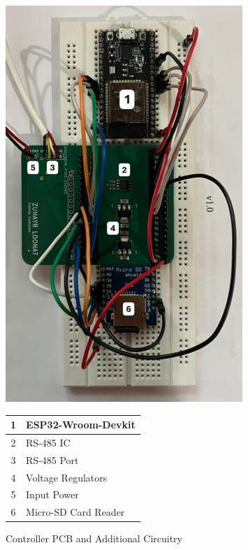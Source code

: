 \begin{figure}[H]
    \begin{minipage}{0.5\textwidth}
        \centering
        \includegraphics[width=0.8\textwidth]{Figures/controller_circuit.jpg}
    \end{minipage}
    \begin{minipage}{0.5\textwidth}
        \centering
        \begin{tabular}{cl} \hline
            1 & ESP32-Wroom-Devkit \\ \hline
            2 & RS-485 IC \\ \hline
            3 & RS-485 Port \\ \hline
            4 & Voltage Regulators \\ \hline
            5 & Input Power \\ \hline
            6 & Micro-SD Card Reader \\ \hline
        \end{tabular}
    \end{minipage}
    \caption{Controller PCB and Additional Circuitry}
    \label{fig:controller_pcb} %
\end{figure}

